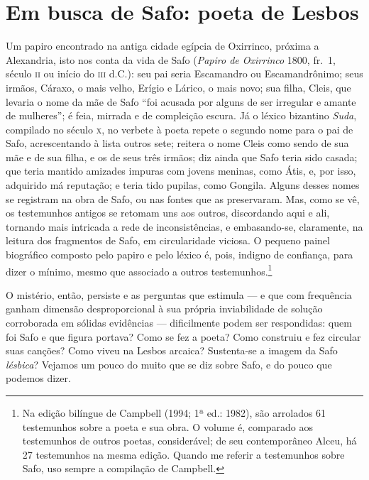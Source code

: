 \section{Em busca de Safo: poeta de Lesbos}

Um papiro encontrado na antiga cidade egípcia de Oxirrinco, próxima a 			\EP[]
Alexandria, isto nos conta da vida de Safo (\textit{Papiro de Oxirrinco} 1800,
fr.~1, século \textsc{ii} ou início do \textsc{iii} d.C.): seu pai seria Escamandro ou
Escamandrônimo; seus irmãos, Cáraxo, o mais velho, Erígio e Lárico, o mais
novo; sua filha, Cleis, que levaria o nome da mãe de Safo ``foi acusada
por alguns de ser irregular e amante de mulheres”; é feia, mirrada e de
compleição escura. Já o léxico bizantino \textit{Suda}, compilado no século \textsc{x},
no verbete à poeta repete o segundo nome para o pai de Safo, acrescentando à
lista outros sete; reitera o nome Cleis como sendo de sua mãe e de sua filha, e
os de seus três irmãos; diz ainda que Safo teria sido casada; que teria mantido
amizades impuras com jovens meninas, como Átis, e, por isso, adquirido má
reputação; e teria tido pupilas, como Gongila. Alguns desses nomes se registram
na obra de Safo, ou nas fontes que as preservaram. Mas, como se vê, os
testemunhos antigos se retomam uns aos outros, discordando aqui e ali, tornando
mais intricada a rede de inconsistências, e embasando-se, claramente, na
leitura dos fragmentos de Safo, em circularidade viciosa. O pequeno painel
biográfico composto pelo papiro e pelo léxico é, pois, indigno de confiança,
para dizer o mínimo, mesmo que associado a outros testemunhos.\footnote{ Na
edição bilíngue de Campbell (1994; 1ª ed.: 1982), são arrolados 61 testemunhos
sobre a poeta e sua obra. O volume é, \mbox{comparado} aos testemunhos de outros
poetas, considerável; de seu contemporâneo Alceu, há 27 testemunhos na mesma edição. 
Quando me referir a testemunhos sobre Safo, uso
sempre a compilação de Campbell.}

O mistério, então, persiste e as perguntas que estimula --- e que com frequência
ganham dimensão desproporcional à sua própria inviabilidade de solução
corroborada em sólidas evidências --- dificilmente podem ser respondidas: quem
foi Safo e que figura portava? Como se fez a poeta? Como construiu e fez
circular suas canções? Como viveu na Lesbos arcaica? Sustenta-se a imagem da
Safo \textit{lésbica}? Vejamos um pouco do muito que se diz sobre Safo, e do
pouco que podemos dizer.


